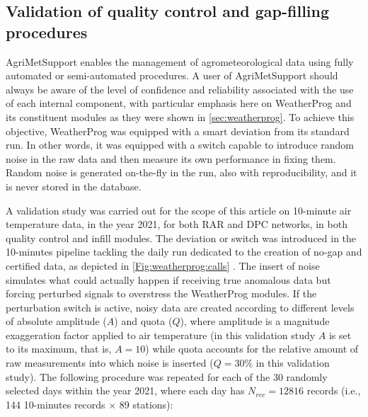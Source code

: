 \documentclass[authoryear,preprint,review,12pt]{elsarticle}
\newcommand{\note}[1]{\emph{\textcolor{red}{#1}}}
\begin{document}
\subsection{Validation of quality control and gap-filling procedures} \label{sec:QcheckValidation}
AgriMetSupport enables the management of agrometeorological data using fully automated or semi-automated procedures. %
A user of AgriMetSupport should always be aware of the level of confidence and reliability associated with the use of each internal component, with particular emphasis here on WeatherProg and its constituent modules as they were shown in \cref{sec:weatherprog}. 
To achieve this objective, WeatherProg was equipped with a smart deviation from its standard run.
In other words, it was equipped with a switch capable to introduce random noise in the raw data and then measure its own performance in fixing them. %
Random noise is generated on-the-fly in the run, also with reproducibility, and it is never stored in the database.

A validation study was carried out for the scope of this article on 10-minute air temperature data, in the year 2021, for both RAR and DPC networks, in both quality control and infill modules.
The deviation or switch was introduced in the 10-minutes pipeline tackling the daily run dedicated to the creation of no-gap and certified data, as depicted in \cref{Fig:weatherprog:calls} .%
The insert of noise simulates what could actually happen if receiving true anomalous data but forcing perturbed signals to overstress the WeatherProg modules.
If the perturbation switch is active, noisy data are created according to different levels of absolute amplitude ($A$) and quota ($Q$), where amplitude is a magnitude exaggeration factor applied to air temperature (in this validation study $A$ is set to its maximum, that is, $A=10$) while quota accounts for the relative amount of raw measurements into which noise is inserted ($Q=30\%$ in this validation study).
The following procedure was repeated for each of the 30 randomly selected days within the year 2021, where each day has $N_{rec}=12816$ records (i.e., 144 10-minutes records $\times$ 89 stations):
\end{document}
